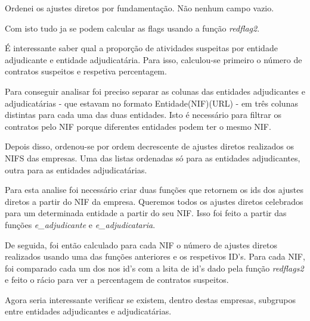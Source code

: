 Ordenei os ajustes diretos por fundamentação. Não nenhum campo vazio. 

Com isto tudo ja se podem calcular as flags usando a função \textit{redflag2}. 

É interessante saber qual a proporção de atividades suspeitas por entidade adjudicante e entidade adjudicatária. Para isso, calculou-se primeiro o número de contratos suspeitos e respetiva percentagem. 

Para conseguir analisar foi preciso separar as colunas das entidades adjudicantes e adjudicatárias - que estavam no formato Entidade(NIF)(URL) - em três colunas distintas para cada uma das duas entidades. Isto é necessário para filtrar os contratos pelo NIF porque diferentes entidades podem ter o mesmo NIF. 

Depois disso, ordenou-se por ordem decrescente de ajustes diretos realizados os NIFS das empresas. Uma das listas ordenadas só para as entidades adjudicantes, outra para as entidades adjudicatárias. 

Para esta analise foi necessário criar duas funções que retornem os ids dos ajustes diretos a partir do NIF da empresa. Queremos todos os ajustes diretos celebrados para um determinada entidade a partir do seu NIF. Isso foi feito a partir das funções \textit{e\_adjudicante} e \textit{e\_adjudicataria}. 

De seguida, foi então calculado para cada NIF o número de ajustes diretos realizados usando uma das funções anteriores e os respetivos ID's. Para cada NIF, foi comparado cada um dos nos id's com a lsita de id's dado pela função \textit{redflags2} e feito o rácio para ver a percentagem de contratos suspeitos. 

Agora seria interessante verificar se existem, dentro destas empresas, subgrupos entre entidades adjudicantes e adjudicatárias. 






























